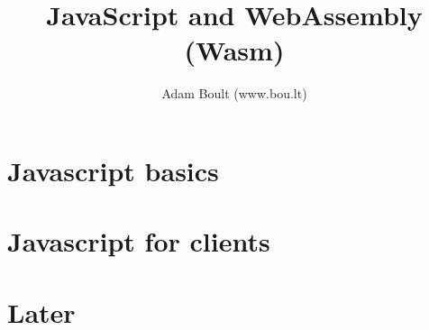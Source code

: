 \documentclass[oneside]{book}
\begin{document}
\author{Adam Boult (www.bou.lt)}
\title{JavaScript and WebAssembly (Wasm)}
\maketitle

\setcounter{tocdepth}{0}
\tableofcontents



\part{Javascript basics}







\part{Javascript for clients}




\part{Later}

\end{document}

